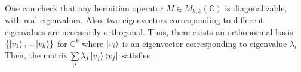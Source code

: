 {%
\begin{comment}
Conventionally, for a ket $\ket{v}$, there is a corresponding dual vector \textit{"bra"} $\bra{v}$ such that
\begin{equation} \label{bra defn}
    \bra{v}(\ket{w}):=\braket{v|w}:=(\ket{v}, \ket{w})
\end{equation}
It turns out that the matrix representation of dual vectors is just a row vector as illustrated below:\\
Let $\{\ket{u_i}\}_{i=1}^{i=n}$ be some orthonormal basis of an inner product space V. Let $ \ket{v}=\sum_j v_j \ket{u_j}, \ket{w}=\sum_i w_i \ket{u_i}$. Since $(\ket{u_i},\ket{u_j})=\delta_{ij}$, using \eqref{inner product defn} and \eqref{bra defn}, we get
\begin{equation} \label{eqn: braket}
    \braket{v|w}=(\sum_j v_j \ket{u_j}, \sum_i w_i \ket{u_i})=\sum_i \sum_j v_i^* w_j \delta_{ij} = \sum_i v_i^* w_i = (v_1^*,\hdots, v_n^*)
    \icol{w_1\\ \vdots \\ w_n }
\end{equation}

As we can see, the bra vector $\bra{v}$ can be interpreted as the conjugate transpose of $\ket{v}$. 

In addition, a useful way of representing linear operators which makes use of the inner product is called the \textit{outer product} representation. Suppose $\ket{v} \in V, \ket{w} \in W$, where $V, W$ are both inner product space. Define $\ket{w}, \ket{v}$ to be the linear operator from V to W such that
\begin{equation}
    (\ket{w}\ket{v})(\ket{v'}):=\ket{w}\braket{v|v'}=\braket{v|v'}\ket{w}
\end{equation}

In other words, the bra-ket notation convention allows us to interpret $\ket{w}\braket{v|v'}$ in two ways: the operator $\ket{w}\bra{v}$ acting on $\ket{v'}$, or multiplying $\ket{w}$ by the complex number $\braket{v|v'}$.
\end{comment}
One can check that any hermitian operator $M \in M_{k,k}(\mathbb{C})$ is diagonalizable, with real eigenvalues.  Also, two eigenvectors corresponding to different eigenvalues are necessarily orthogonal.  Thus, there exists an orthonormal basis $\{\ket{v_1},...\ket{v_k}\}$ for $\mathbb{C}^k$ where $\ket{v_i}$ is an eigenvector corresponding to eigenvalue $\lambda_i$  Then, the matrix $\sum\limits_j \lambda_j \ket{v_j}\bra{v_j}$ satisfies

}
